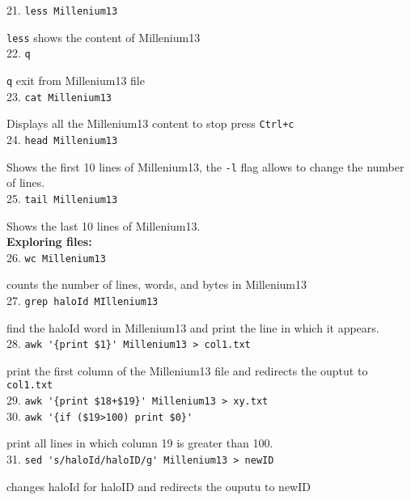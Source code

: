 \documentclass[12pt]{article}
\begin{document}
21. \verb+less Millenium13+

{\color{blue} \verb+less+ shows the content of Millenium13}\\

22. \verb+q+

{\color{blue} \verb+q+ exit from Millenium13 file}\\

23. \verb+cat Millenium13+

{\color{blue} Displays all the Millenium13 content to stop press \verb"Ctrl+c"}\\

 
24. \verb+head Millenium13+ 

{\color{blue} Shows the first 10 lines of Millenium13, the \verb+-l+ flag
allows to change the number of lines.}\\

25. \verb+tail Millenium13+

{\color{blue} Shows the last 10 lines of Millenium13.}\\

\textbf{Exploring files:}\\

26. \verb+wc Millenium13+

{\color{blue} counts the number of lines, words, and bytes in Millenium13}\\
 
27. \verb+grep haloId MIllenium13+

{\color{blue} find the haloId word in Millenium13 and print the line in which it appears.}\\

28. \verb+awk '{print $1}' Millenium13 > col1.txt+

{\color{blue} print the first column of the Millenium13 file and redirects the ouptut to \verb+col1.txt+}\\

29. \verb"awk '{print $18+$19}' Millenium13 > xy.txt" \\

30. \verb+awk '{if ($19>100) print $0}'+

{\color{blue} print all lines in which column 19 is greater than 100.}\\

31. \verb+sed 's/haloId/haloID/g' Millenium13 > newID+

{\color{blue} changes haloId for haloID and redirects the ouputu to newID}\\
\end{document}
